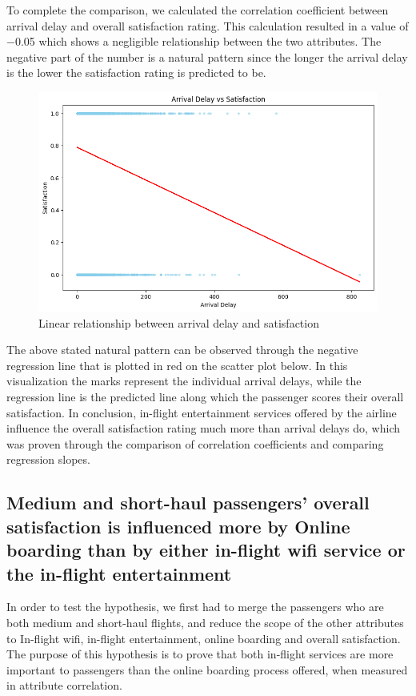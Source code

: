 \documentclass[11pt]{article}
\begin{document}
To complete the comparison, we calculated the correlation coefficient between arrival delay and overall satisfaction rating. This calculation resulted in a value of \num{-0.05} which shows a negligible relationship between the two attributes. The negative part of the number is a natural pattern since the longer the arrival delay is the lower the satisfaction rating is predicted to be. 

\begin{figure}[h]
\centering
\includegraphics[width=0.5\linewidth]{project_files/project_22_2.png}
\caption{Linear relationship between arrival delay and satisfaction}
\end{figure}

The above stated natural pattern can be observed through the negative regression line that is plotted in red on the scatter plot below. In this visualization the marks represent the individual arrival delays, while the regression line is the predicted line along which the passenger scores their overall satisfaction. In conclusion, in-flight entertainment services offered by the airline influence the overall satisfaction rating much more than arrival delays do, which was proven through the comparison of correlation coefficients and comparing regression slopes.
        
\subsection{Medium and short-haul passengers' overall satisfaction is influenced more by Online boarding than by either in-flight wifi service or the in-flight entertainment}

In order to test the hypothesis, we first had to merge the passengers who are both medium and short-haul flights, and reduce the scope of the other attributes to In-flight wifi, in-flight entertainment, online boarding and overall satisfaction. The purpose of this hypothesis is to prove that both in-flight services are more important to passengers than the online boarding process offered, when measured in attribute correlation. 
\end{document}
